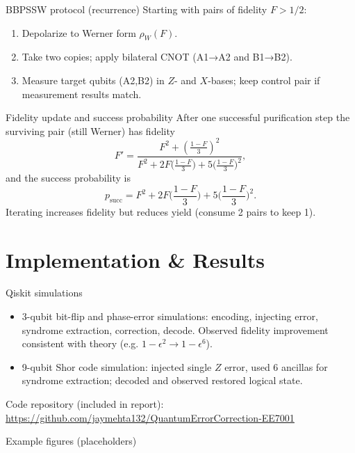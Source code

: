 \documentclass[10pt]{beamer}
\begin{document}
\begin{frame}{BBPSSW protocol (recurrence)}
  Starting with pairs of fidelity \(F>1/2\):
  \begin{enumerate}
    \item Depolarize to Werner form \(\rho_W(F)\).
    \item Take two copies; apply bilateral CNOT (A1→A2 and B1→B2).
    \item Measure target qubits (A2,B2) in \(Z\)- and \(X\)-bases; keep control pair if measurement results match.
  \end{enumerate}
\end{frame}

\begin{frame}{Fidelity update and success probability}
  After one successful purification step the surviving pair (still Werner) has fidelity
  \[
    F'=\frac{F^2 + \left(\tfrac{1-F}{3}\right)^2}{F^2 + 2F\big(\tfrac{1-F}{3}\big) + 5\big(\tfrac{1-F}{3}\big)^2},
  \]
  and the success probability is
  \[
    p_{\text{succ}} = F^2 + 2F\Big(\frac{1-F}{3}\Big) + 5\Big(\frac{1-F}{3}\Big)^2.
  \]
  Iterating increases fidelity but reduces yield (consume 2 pairs to keep 1).
\end{frame}

\section{Implementation \& Results}
\begin{frame}{Qiskit simulations}
  \begin{itemize}
    \item 3-qubit bit-flip and phase-error simulations: encoding, injecting error, syndrome extraction, correction, decode. Observed fidelity improvement consistent with theory (e.g. \(1-\epsilon^2 \to 1-\epsilon^6\)).
    \item 9-qubit Shor code simulation: injected single \(Z\) error, used 6 ancillas for syndrome extraction; decoded and observed restored logical state.
  \end{itemize}
  Code repository (included in report): \\
  \small \url{https://github.com/jaymehta132/QuantumErrorCorrection-EE7001}
\end{frame}

\begin{frame}{Example figures (placeholders)}
  
\end{frame}
\end{document}
